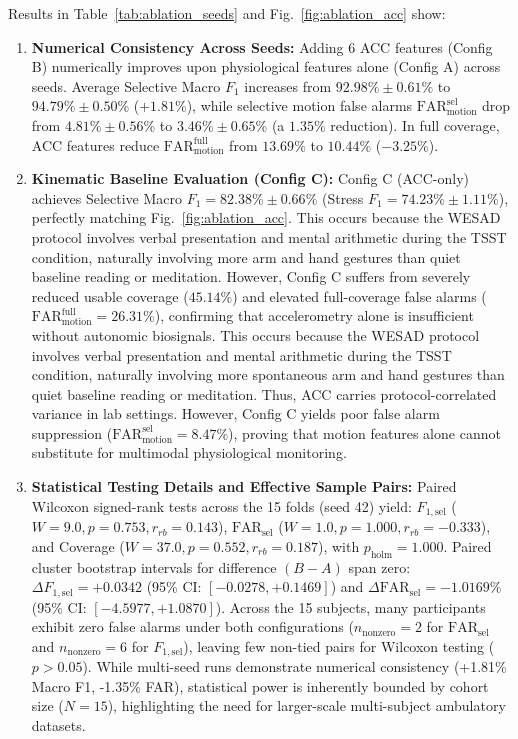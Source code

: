 \documentclass[conference]{IEEEtran}
\begin{document}
Results in Table~\ref{tab:ablation_seeds} and Fig.~\ref{fig:ablation_acc} show:
\begin{enumerate}
    \item \textbf{Numerical Consistency Across Seeds:} Adding 6 ACC features (Config B) numerically improves upon physiological features alone (Config A) across seeds. Average Selective Macro $F_1$ increases from $92.98\% \pm 0.61\%$ to $94.79\% \pm 0.50\%$ ($+1.81\%$), while selective motion false alarms $\text{FAR}_{\text{motion}}^{\text{sel}}$ drop from $4.81\% \pm 0.56\%$ to $3.46\% \pm 0.65\%$ (a $1.35\%$ reduction). In full coverage, ACC features reduce $\text{FAR}_{\text{motion}}^{\text{full}}$ from $13.69\%$ to $10.44\%$ ($-3.25\%$).
    \item \textbf{Kinematic Baseline Evaluation (Config C):} Config C (ACC-only) achieves Selective Macro $F_1 = 82.38\% \pm 0.66\%$ (Stress $F_1 = 74.23\% \pm 1.11\%$), perfectly matching Fig.~\ref{fig:ablation_acc}. This occurs because the WESAD protocol involves verbal presentation and mental arithmetic during the TSST condition, naturally involving more arm and hand gestures than quiet baseline reading or meditation. However, Config C suffers from severely reduced usable coverage ($45.14\%$) and elevated full-coverage false alarms ($\text{FAR}_{\text{motion}}^{\text{full}} = 26.31\%$), confirming that accelerometry alone is insufficient without autonomic biosignals. This occurs because the WESAD protocol involves verbal presentation and mental arithmetic during the TSST condition, naturally involving more spontaneous arm and hand gestures than quiet baseline reading or meditation. Thus, ACC carries protocol-correlated variance in lab settings. However, Config C yields poor false alarm suppression ($\text{FAR}_{\text{motion}}^{\text{sel}} = 8.47\%$), proving that motion features alone cannot substitute for multimodal physiological monitoring.
    \item \textbf{Statistical Testing Details and Effective Sample Pairs:} Paired Wilcoxon signed-rank tests across the 15 folds (seed 42) yield: $F_{1,\text{sel}}$ ($W = 9.0, p = 0.753, r_{rb} = 0.143$), $\text{FAR}_{\text{sel}}$ ($W = 1.0, p = 1.000, r_{rb} = -0.333$), and Coverage ($W = 37.0, p = 0.552, r_{rb} = 0.187$), with $p_{\text{holm}} = 1.000$. Paired cluster bootstrap intervals for difference $(B - A)$ span zero: $\Delta F_{1,\text{sel}} = +0.0342$ (95\% CI: $[-0.0278, +0.1469]$) and $\Delta \text{FAR}_{\text{sel}} = -1.0169\%$ (95\% CI: $[-4.5977, +1.0870]$). Across the 15 subjects, many participants exhibit zero false alarms under both configurations ($n_{\text{nonzero}} = 2$ for $\text{FAR}_{\text{sel}}$ and $n_{\text{nonzero}} = 6$ for $F_{1,\text{sel}}$), leaving few non-tied pairs for Wilcoxon testing ($p > 0.05$). While multi-seed runs demonstrate numerical consistency (+1.81\% Macro F1, -1.35\% FAR), statistical power is inherently bounded by cohort size ($N=15$), highlighting the need for larger-scale multi-subject ambulatory datasets.
\end{enumerate}
\end{document}
